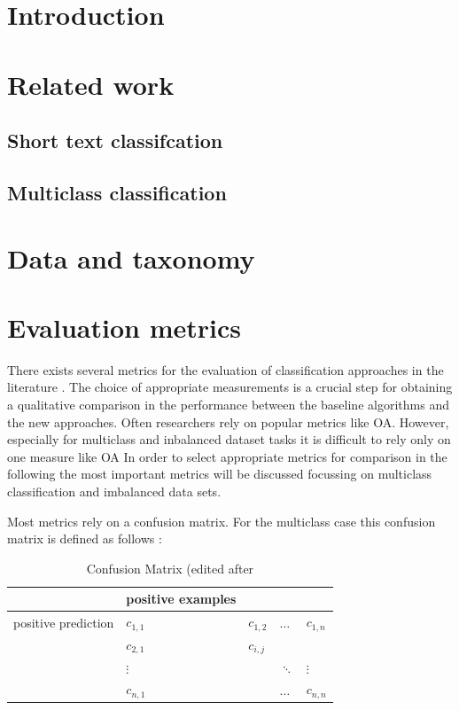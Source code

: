 \documentclass[12pt, a4paper, titlepage]{article}
\begin{document}
\section{Introduction}
\section{Related work}
\subsection{Short text classifcation}
\subsection{Multiclass classification}
\section{Data and taxonomy}
\section{Evaluation metrics}

There exists several metrics for the evaluation of classification approaches in the literature \citep{Fatourechi2008}. The choice of appropriate measurements is a crucial step for obtaining a qualitative comparison in the performance between the baseline algorithms and the new approaches. Often researchers rely on popular metrics like \ac{OA}. However, especially for multiclass and inbalanced dataset tasks it is difficult to rely only on one measure like \ac{OA} In order to select appropriate metrics for comparison in the following the most important metrics will be discussed focussing on multiclass classification and imbalanced data sets. 

Most metrics rely on a confusion matrix. For the multiclass case this confusion matrix is defined as follows \citep{Kautz2017}: 
\begin{table}[hb!]
  \center
  \begin{tabular}{lllll}
  \hline
            & positive examples      &           &             &             \\ \hline
  positive prediction  & $c_{1,1}$ & $c_{1,2}$ & $\dots$     & $c_{1,n}$   \\
            & $c_{2,1}$ & $c_{i,j}$ &             &             \\
            &  $\vdots$         &           & $\ddots$ &   $\vdots$\\
            & $c_{n,1}$ &           & $\dots$     & $c_{n,n}$   \\ \hline
  \end{tabular}
  \caption{\label{tab: T1} Confusion Matrix (edited after \citep[113]{Kautz2017}}
  \end{table}
\end{document}
